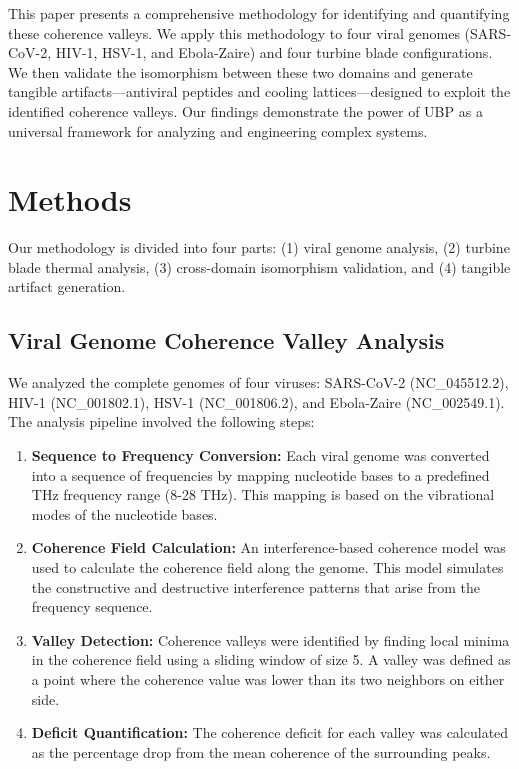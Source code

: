 \documentclass[11pt, a4paper]{article}
\begin{document}
This paper presents a comprehensive methodology for identifying and quantifying these coherence valleys. We apply this methodology to four viral genomes (SARS-CoV-2, HIV-1, HSV-1, and Ebola-Zaire) and four turbine blade configurations. We then validate the isomorphism between these two domains and generate tangible artifacts—antiviral peptides and cooling lattices—designed to exploit the identified coherence valleys. Our findings demonstrate the power of UBP as a universal framework for analyzing and engineering complex systems.

\section{Methods}

Our methodology is divided into four parts: (1) viral genome analysis, (2) turbine blade thermal analysis, (3) cross-domain isomorphism validation, and (4) tangible artifact generation.

\subsection{Viral Genome Coherence Valley Analysis}
We analyzed the complete genomes of four viruses: SARS-CoV-2 (NC\_045512.2), HIV-1 (NC\_001802.1), HSV-1 (NC\_001806.2), and Ebola-Zaire (NC\_002549.1). The analysis pipeline involved the following steps:

\begin{enumerate}
    \item \textbf{Sequence to Frequency Conversion:} Each viral genome was converted into a sequence of frequencies by mapping nucleotide bases to a predefined THz frequency range (8-28 THz). This mapping is based on the vibrational modes of the nucleotide bases.
    \item \textbf{Coherence Field Calculation:} An interference-based coherence model was used to calculate the coherence field along the genome. This model simulates the constructive and destructive interference patterns that arise from the frequency sequence.
    \item \textbf{Valley Detection:} Coherence valleys were identified by finding local minima in the coherence field using a sliding window of size 5. A valley was defined as a point where the coherence value was lower than its two neighbors on either side.
    \item \textbf{Deficit Quantification:} The coherence deficit for each valley was calculated as the percentage drop from the mean coherence of the surrounding peaks.
\end{enumerate}
\end{document}
